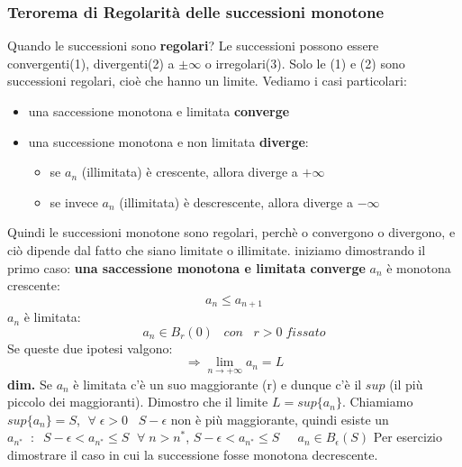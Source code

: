 \subsubsection*{Terorema di Regolarità delle successioni monotone}
Quando le successioni sono \textbf{regolari}? Le successioni possono essere convergenti(1), divergenti(2) a $\pm \infty$ o irregolari(3). Solo le (1) e (2) sono successioni regolari, cioè che hanno un limite.
\newline
Vediamo i casi particolari:
\begin{itemize}
    \item una saccessione monotona e limitata \textbf{converge}
    \item una successione monotona e non limitata \textbf{diverge}:
    \begin{itemize}
        \item se $a_n$ (illimitata) è crescente, allora diverge a $+ \infty$
        \item se invece $a_n$ (illimitata) è descrescente, allora diverge a $-\infty$
    \end{itemize}
\end{itemize}
Quindi le successioni monotone sono regolari, perchè o convergono o divergono, e ciò dipende dal fatto che siano limitate o illimitate.
\newline
\newline
iniziamo dimostrando il primo caso:
\newline
\textbf{una saccessione monotona e limitata converge} 
\newline
$a_n$ è monotona crescente:
\[
    a_n \leq a_{n+1}
\]
$a_n$ è limitata:
\[
    a_n \in B_r(0) \;\;\;con \;\;\;r>0 \; fissato
\]
Se queste due ipotesi valgono:
\[
    \Rightarrow \lim_{n\rightarrow +\infty} a_n = L
\]
\textbf{dim.} 
Se $a_n$ è limitata c'è un suo maggiorante (r) e dunque c'è il $sup$ (il più piccolo dei maggioranti). Dimostro che il limite $L = sup\{a_n\}$.
\newline
Chiamiamo $sup\{a_n\} = S$, $\;\forall\;\epsilon> 0 \;\;\; S-\epsilon $ non è più maggiorante, quindi esiste un $a_{n^{*}} \;\;:\;\; S-\epsilon < a_{n^*}\leq S$
\newline
$\;\forall\;n> n^*$, $S-\epsilon < a_{n^*} \leq S \;\;\;\;$ $a_n \in B_{\epsilon}(S)$
\newline
Per esercizio dimostrare il caso in cui la successione fosse monotona decrescente.
\newline
\newline
